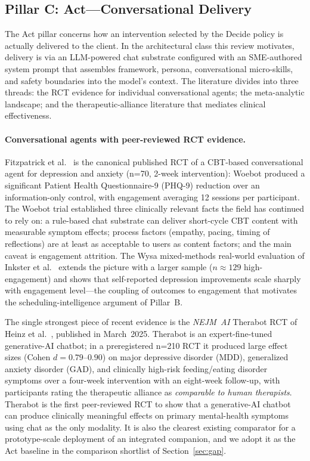 \documentclass[11pt,a4paper]{article}
\newcommand{\secref}[1]{Section~\ref{#1}}
\begin{document}
\subsection{Pillar C: Act---Conversational Delivery}\label{sec:act}

The Act pillar concerns how an intervention selected by the Decide
policy is actually delivered to the client. In the architectural
class this review motivates, delivery is via an LLM-powered chat
substrate configured with an SME-authored system prompt that
assembles framework, persona, conversational micro-skills, and
safety boundaries into the model's context. The literature divides
into three threads: the RCT evidence for individual conversational
agents; the meta-analytic landscape; and the therapeutic-alliance
literature that mediates clinical effectiveness.

\paragraph{Conversational agents with peer-reviewed RCT evidence.}
Fitzpatrick et al.~\cite{Fitzpatrick2017Woebot} is the canonical
published RCT of a CBT-based conversational agent for depression
and anxiety (n=70, 2-week intervention): Woebot produced a
significant Patient Health Questionnaire-9 (PHQ-9) reduction over
an information-only control, with engagement averaging 12 sessions
per participant. The Woebot trial established three clinically
relevant facts the field has continued to rely on: a rule-based
chat substrate can deliver short-cycle CBT content with measurable
symptom effects; process factors (empathy, pacing, timing of
reflections) are at least as acceptable to users as content
factors; and the main caveat is engagement attrition. The Wysa
mixed-methods real-world evaluation of Inkster et
al.~\cite{Inkster2018Wysa} extends the picture with a larger
sample ($n\!\approx\!129$ high-engagement) and shows that
self-reported depression improvements scale sharply with
engagement level---the coupling of outcomes to engagement that
motivates the scheduling-intelligence argument of Pillar~B.

The single strongest piece of recent evidence is the
\textit{NEJM~AI} Therabot RCT of Heinz et
al.~\cite{Heinz2025TherabotRCT}, published in March~2025. Therabot
is an expert-fine-tuned generative-AI chatbot; in a preregistered
n=210 RCT it produced large effect sizes (Cohen
$d\!=\!0.79\text{--}0.90$) on major depressive disorder (MDD),
generalized anxiety disorder (GAD), and clinically high-risk
feeding/eating disorder symptoms over a four-week intervention with
an eight-week follow-up, with participants rating the therapeutic
alliance as \emph{comparable to human therapists}. Therabot is the
first peer-reviewed RCT to show that a generative-AI chatbot can
produce clinically meaningful effects on primary mental-health
symptoms using chat as the only modality. It is also the clearest
existing comparator for a prototype-scale deployment of an
integrated companion, and we adopt it as the Act baseline in the
comparison shortlist of \secref{sec:gap}.
\end{document}
